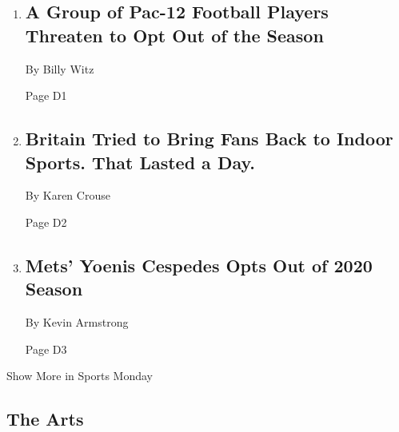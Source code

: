 \begin{enumerate}
\def\labelenumi{\arabic{enumi}.}
\item
  \href{/2020/08/02/sports/ncaafootball/coronavirus-college-football-pac-12.html}{}

  \hypertarget{a-group-of-pac-12-football-players-threaten-to-opt-out-of-the-season}{%
  \subsection{A Group of Pac-12 Football Players Threaten to Opt Out of
  the
  Season}\label{a-group-of-pac-12-football-players-threaten-to-opt-out-of-the-season}}

  By Billy Witz

  Page D1
\item
  \href{/2020/08/02/sports/snooker-world-championship.html}{}

  \hypertarget{britain-tried-to-bring-fans-back-to-indoor-sports-that-lasted-a-day}{%
  \subsection{Britain Tried to Bring Fans Back to Indoor Sports. That
  Lasted a
  Day.}\label{britain-tried-to-bring-fans-back-to-indoor-sports-that-lasted-a-day}}

  By Karen Crouse

  Page D2
\item
  \href{/2020/08/02/sports/baseball/Yoenis-cespedes-opt-out-rule.html}{}

  \hypertarget{mets-yoenis-cespedes-opts-out-of-2020-season}{%
  \subsection{Mets' Yoenis Cespedes Opts Out of 2020
  Season}\label{mets-yoenis-cespedes-opts-out-of-2020-season}}

  By Kevin Armstrong

  Page D3
\end{enumerate}

Show More in Sports Monday

\hypertarget{the-arts}{%
\subsection{The Arts}\label{the-arts}}

